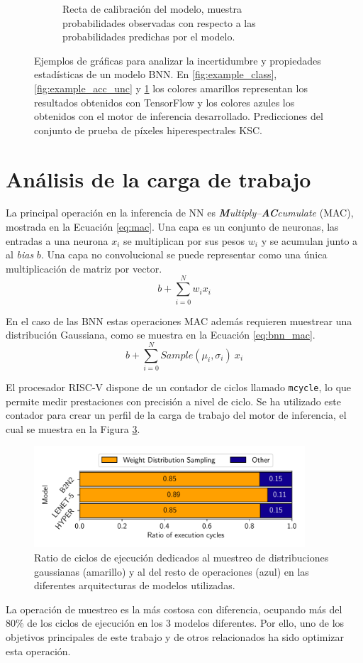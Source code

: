 \begin{figure}[h]
\begin{subfigure}[b]{0.48\textwidth}
     	\caption{Recta de calibración del modelo, muestra probabilidades observadas con respecto a las probabilidades predichas por el modelo.}
     	\label{fig:example_calibration}
 	\end{subfigure}
    	\caption{Ejemplos de gráficas para analizar la incertidumbre y propiedades estadísticas de un modelo BNN. En \ref{fig:example_class}, \ref{fig:example_acc_unc} y \ref{fig:example_calibration} los colores amarillos representan los resultados obtenidos con TensorFlow y los colores azules los obtenidos con el motor de inferencia desarrollado. Predicciones del conjunto de prueba de píxeles hiperespectrales KSC.}
    	\label{fig:figure_example}
\end{figure}

\section{Análisis de la carga de trabajo}

La principal operación en la inferencia de NN es \textit{\textbf{M}ultiply–\textbf{AC}cumulate} (MAC), mostrada en la Ecuación \ref{eq:mac}. Una capa es un conjunto de neuronas, las entradas a una neurona $x_i$ se multiplican por sus pesos $w_i$ y se acumulan junto a al \textit{bias} $b$. Una capa no convolucional se puede representar como una única multiplicación de matriz por vector.
\begin{equation} \label{eq:mac}
b + \sum_{i=0}^N w_i x_i
\end{equation}

En el caso de las BNN estas operaciones MAC además requieren muestrear una distribución Gaussiana, como se muestra en la Ecuación \ref{eq:bnn_mac}.
\begin{equation} \label{eq:bnn_mac}
b + \sum_{i=0}^N Sample(\mu_i, \sigma_i)\ x_i
\end{equation}

El procesador RISC-V dispone de un contador de ciclos llamado \texttt{mcycle}, lo que permite medir prestaciones con precisión a nivel de ciclo. Se ha utilizado este contador para crear un perfil de la carga de trabajo del motor de inferencia, el cual se muestra en la Figura \ref{fig:cycle_profile}.

\begin{figure}[h]
	\centering
	\includegraphics[width=0.9\textwidth]{root/Imagenes/bnn_lib/cycles.pdf}
	\caption{Ratio de ciclos de ejecución dedicados al muestreo de distribuciones gaussianas (amarillo) y al del resto de operaciones (azul) en las diferentes arquitecturas de modelos utilizadas.}
	\label{fig:cycle_profile}
\end{figure}

La operación de muestreo es la más costosa con diferencia, ocupando más del 80\% de los ciclos de ejecución en los 3 modelos diferentes. Por ello, uno de los objetivos principales de este trabajo y de otros relacionados ha sido optimizar esta operación.
